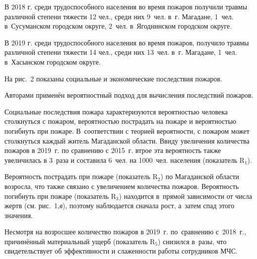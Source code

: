 В 2018 г. среди трудоспособного населения во время пожаров получили травмы различной степени тяжести 12 чел., среди них 9~чел. в~г. Магадане, 1~чел. в~Сусуманском городском округе, 2~чел. в~Ягоднинском городском округе.

В 2019 г. среди трудоспособного населения во время пожаров, получило травмы различной степени тяжести 14 чел., среди них 13~чел. в~г. Магадане, 1~чел. в~Хасынском городском округе.

На рис.~2 показаны социальные и экономические последствия пожаров.



Авторами применён вероятностный подход для вычисления последствий
пожаров.

Социальные последствия пожара характеризуются вероятностью человека
столкнуться с пожаром, вероятностью пострадать на пожаре и вероятностью
погибнуть при пожаре. В~соответствии с теорией вероятности, с пожаром
может столкнуться каждый житель Магаданской области. Ввиду увеличения
количества пожаров в 2019~г. по сравнению с 2015~г. втрое эта
вероятность также увеличилась в 3~раза и составила 6~чел. на 1000~чел.
населения (показатель R$_1$).

Вероятность пострадать при пожаре (показатель R$_2$) по Магаданской
области возросла, что также связано с увеличением количества пожаров.
Вероятность погибнуть при пожаре (показатель R$_3$) находится в~прямой
зависимости от числа жертв (см. рис.~1,\textit{в}), поэтому наблюдается сначала
рост, а~затем спад этого значения.

Несмотря на возросшее количество пожаров в 2019~г. по~сравнению с~2018~г., причинённый материальный ущерб (показатель R$_5$) снизился в~разы, что свидетельствует об эффективности и слаженности работы сотрудников МЧС.

